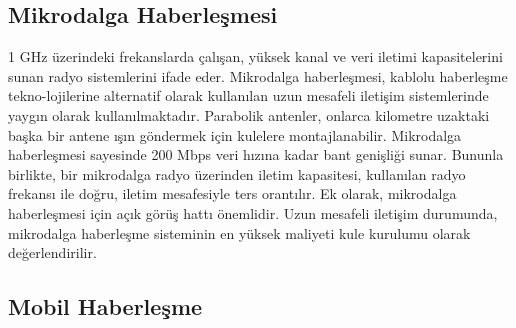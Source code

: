 \subsection{Mikrodalga Haberleşmesi} \label{mikrohaberlesme}
1 GHz üzerindeki frekanslarda çalışan, yüksek kanal ve veri iletimi kapasitelerini sunan radyo sistemlerini ifade eder. Mikrodalga haberleşmesi, kablolu haberleşme tekno-lojilerine alternatif olarak kullanılan uzun mesafeli iletişim sistemlerinde yaygın olarak kullanılmaktadır. Parabolik antenler, onlarca kilometre uzaktaki başka bir antene ışın göndermek için kulelere montajlanabilir. Mikrodalga haberleşmesi sayesinde 200 Mbps veri hızına kadar bant genişliği sunar. Bununla birlikte, bir mikrodalga radyo üzerinden iletim kapasitesi, kullanılan radyo frekansı ile doğru, iletim mesafesiyle ters orantılır. Ek olarak, mikrodalga haberleşmesi için açık görüş hattı önemlidir. Uzun mesafeli iletişim durumunda, mikrodalga haberleşme sisteminin en yüksek maliyeti kule kurulumu olarak değerlendirilir\cite{misra2012radio}.

\begin{comment}
\subsection{Ultra Yüksek Frekans Haberleşmesi}

0,3 -- 1 Ghz arasındaki frekans bandında çalışan haberleşme sistemi olarak tanım-lanan \gls{uhf} haberleşmesi mikrodalga haberleşmesinden fark-lı olarak görüş hattı olmaksı-zın veri iletimi imkanı sunar. Haberleşme anteninin boyutlarına bağlı olarak 30kmyi aşan bir mesafeye 192 kb/s’lik bir bant genişliğinde veri iletimi yapabilir. \gls{uhf} haberleşmesi düşük bant gerektiren özellikle görüş hattının zor olduğu arazilerde yaygın olduğu uygulamalar için makul bir haberleşme çözümüdür\cite{perez2002path}.

\end{comment}

\subsection{Mobil Haberleşme}

